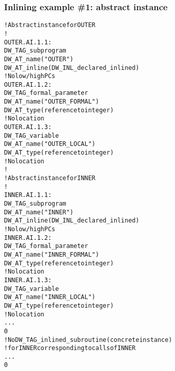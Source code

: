 \subsubsection{Inlining example \#1: abstract instance}
\label{app:inliningexample1abstractinstance}
\begin{alltt}
    ! Abstract instance for OUTER
    !
OUTER.AI.1.1:
    DW\_TAG\_subprogram
        DW\_AT\_name("OUTER")
        DW\_AT\_inline(DW\_INL\_declared\_inlined)
        ! No low/high PCs
OUTER.AI.1.2:
        DW\_TAG\_formal\_parameter
            DW\_AT\_name("OUTER\_FORMAL")
            DW\_AT\_type(reference to integer)
            ! No location
OUTER.AI.1.3:
        DW\_TAG\_variable
            DW\_AT\_name("OUTER\_LOCAL")
            DW\_AT\_type(reference to integer)
            ! No location
        !
        ! Abstract instance for INNER
        !
INNER.AI.1.1:
        DW\_TAG\_subprogram
            DW\_AT\_name("INNER")
            DW\_AT\_inline(DW\_INL\_declared\_inlined)
            ! No low/high PCs
INNER.AI.1.2:
            DW\_TAG\_formal\_parameter
                DW\_AT\_name("INNER\_FORMAL")
                DW\_AT\_type(reference to integer)
                ! No location
INNER.AI.1.3:
            DW\_TAG\_variable
                DW\_AT\_name("INNER\_LOCAL")
                DW\_AT\_type(reference to integer)
                ! No location
            ...
            0
        ! No DW\_TAG\_inlined\_subroutine (concrete instance)
        ! for INNER corresponding to calls of INNER
        ...
        0
\end{alltt}


